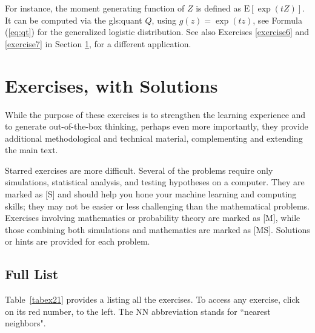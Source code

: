 \documentclass[10pt]{article}
\begin{document}
For instance, the moment generating function of $Z$ is defined as $\mbox{E}[\exp(tZ)]$. It can be computed via the \gls{gls:quant} $Q$,  using $g(z)=\exp(tz)$, see Formula (\ref{eq:qt}) for the generalized logistic distribution. See also Exercises \ref{exercise6}
and \ref{exercise7} in Section \ref{ex:1}, for a different application.

\pagebreak

\section{Exercises, with Solutions}\label{ex:1}

While the purpose of these exercises is to  strengthen the learning experience and to generate out-of-the-box thinking, perhaps even more importantly, they provide additional methodological and technical material, complementing and extending the main text.

Starred exercises are more difficult. Several of the problems require only simulations, statistical analysis, and testing hypotheses on a computer. They are marked as [S] and should help you hone your machine learning and computing skills; they may not be easier or less challenging than the mathematical problems. Exercises involving mathematics or probability theory are marked as [M], while those combining both simulations and mathematics are marked as [MS]. Solutions or hints are provided for each problem.

\subsection{Full List}\label{se12}

Table~\ref{tabex21} provides a listing all the exercises. To access any exercise, click on its red number, to the left. The NN abbreviation stands for ``nearest neighbors".
\end{document}
